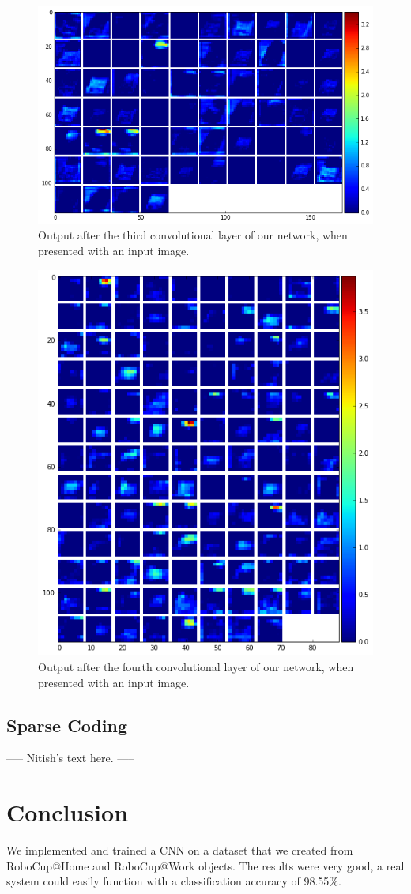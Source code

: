 \documentclass[	DIV=calc,%
				paper=a4,%
				fontsize=11pt,%
				twocolumn]{scrartcl}	 %
\begin{document}
\begin{figure}[H]
    \centering
    \includegraphics[width=0.5\linewidth]{data/final_cnn_thirdlayer}
    \caption{Output after the third convolutional layer of our network, when presented with an input image.}
\end{figure}

\begin{figure}[H]
    \centering
    \includegraphics[width=0.5\linewidth]{data/final_cnn_fourthlayer}
    \caption{Output after the fourth convolutional layer of our network, when presented with an input image.}
\end{figure}

\subsection*{Sparse Coding}
----- Nitish's text here. -----

\section{Conclusion}

We implemented and trained a CNN on a dataset that we created from RoboCup@Home and RoboCup@Work objects. The results were very good, a real system could easily function with a classification accuracy of 98.55\%. 
\end{document}
